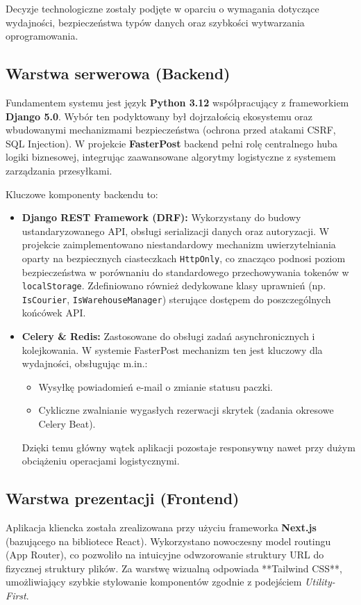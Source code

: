 Decyzje technologiczne zostały podjęte w oparciu o wymagania dotyczące wydajności, bezpieczeństwa typów danych oraz szybkości wytwarzania oprogramowania.

\subsection{Warstwa serwerowa (Backend)}
Fundamentem systemu jest język \textbf{Python 3.12} współpracujący z frameworkiem \textbf{Django 5.0}. Wybór ten podyktowany był dojrzałością ekosystemu oraz wbudowanymi mechanizmami bezpieczeństwa (ochrona przed atakami CSRF, SQL Injection). W projekcie \textbf{FasterPost} backend pełni rolę centralnego huba logiki biznesowej, integrując zaawansowane algorytmy logistyczne z systemem zarządzania przesyłkami.

Kluczowe komponenty backendu to:
\begin{itemize}
    \item \textbf{Django REST Framework (DRF):} Wykorzystany do budowy ustandaryzowanego API, obsługi serializacji danych oraz autoryzacji. W projekcie zaimplementowano niestandardowy mechanizm uwierzytelniania oparty na bezpiecznych ciasteczkach \texttt{HttpOnly}, co znacząco podnosi poziom bezpieczeństwa w porównaniu do standardowego przechowywania tokenów w \texttt{localStorage}. Zdefiniowano również dedykowane klasy uprawnień (np. \texttt{IsCourier}, \texttt{IsWarehouseManager}) sterujące dostępem do poszczególnych końcówek API.
    \item \textbf{Celery \& Redis:} Zastosowane do obsługi zadań asynchronicznych i kolejkowania. W systemie FasterPost mechanizm ten jest kluczowy dla wydajności, obsługując m.in.:
    \begin{itemize}
        \item Wysyłkę powiadomień e-mail o zmianie statusu paczki.
        \item Cykliczne zwalnianie wygasłych rezerwacji skrytek (zadania okresowe Celery Beat).
    \end{itemize}
    Dzięki temu główny wątek aplikacji pozostaje responsywny nawet przy dużym obciążeniu operacjami logistycznymi.
\end{itemize}

\subsection{Warstwa prezentacji (Frontend)}
Aplikacja kliencka została zrealizowana przy użyciu frameworka \textbf{Next.js} (bazującego na bibliotece React). Wykorzystano nowoczesny model routingu (App Router), co pozwoliło na intuicyjne odwzorowanie struktury URL do fizycznej struktury plików. Za warstwę wizualną odpowiada **Tailwind CSS**, umożliwiający szybkie stylowanie komponentów zgodnie z podejściem \textit{Utility-First}.

